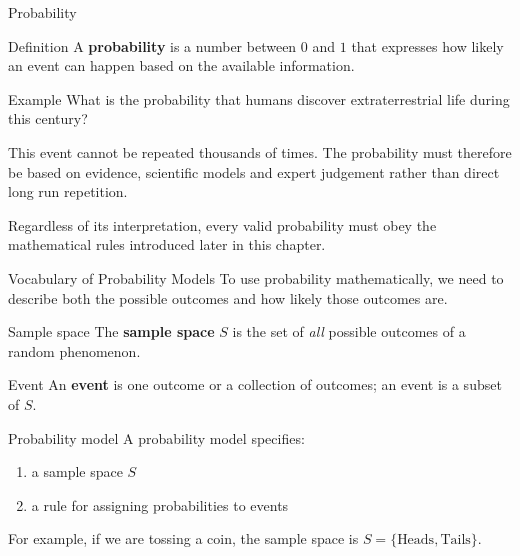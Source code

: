 \documentclass[aspectratio=169]{beamer}
\begin{document}
\begin{frame}{Probability}
\begin{block}{Definition}
A \textbf{probability} is a number between $0$ and $1$ that expresses how likely an event can happen based on the available information.
\end{block}

\begin{exampleblock}{Example}
What is the probability that humans discover extraterrestrial life during this century?
\end{exampleblock}

This event cannot be repeated thousands of times. The probability must therefore be based on evidence, scientific models and expert judgement rather than direct long run repetition.

\vspace{0.25cm}
Regardless of its interpretation, every valid probability must obey the mathematical rules introduced later in this chapter.
\end{frame}

\begin{frame}{Vocabulary of Probability Models}
\small
To use probability mathematically, we need to describe both the possible outcomes and how likely those outcomes are.

\begin{block}{Sample space}
The \textbf{sample space} $S$ is the set of \emph{all} possible outcomes of a random phenomenon.
\end{block}

\begin{block}{Event}
An \textbf{event} is one outcome or a collection of outcomes; an event is a subset of $S$.
\end{block}

\begin{block}{Probability model}
A probability model specifies:
\begin{enumerate}
	\item a sample space $S$
	\item a rule for assigning probabilities to events
\end{enumerate}
\end{block}

\small
For example, if we are tossing a coin, the sample space is $S=\{\text{Heads},\text{Tails}\}$.
\end{frame}
\end{document}

